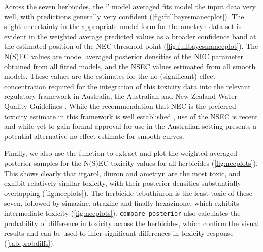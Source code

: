 \documentclass[
  shortnames]{jss}
\newcommand{\cls}[1]{`\code{#1}'}
\begin{document}
Across the seven herbicides, the \cls{bayesmanecfit} model averaged fits model the input data very well, with predictions generally very confident (\autoref{fig:fullbayesmanecplot}). The slight uncertainty in the appropriate model form for the ametryn data set is evident in the weighted average predicted values as a broader confidence band at the estimated position of the NEC threshold point (\autoref{fig:fullbayesmanecplot}). The N(S)EC values are model averaged posterior densities of the NEC parameter obtained from all fitted  models, and the NSEC values estimated from all smooth  models. These values are the  estimates for the no-(significant)-effect concentration required for the integration of this toxicity data into the relevant regulatory framework in Australia, the Australian and New Zealand Water Quality Guidelines \citep{anzg}. While the recommendation that NEC is the preferred toxicity estimate in this framework is well established \citep{Warne2015, Warne2018c}, use of the NSEC is recent \citep{Fisher2023} and while yet to gain formal approval for use in the Australian setting presents a potential alternative no-effect estimate for smooth curves.

Finally, we also use the  function to extract and plot the weighted averaged posterior samples for the N(S)EC toxicity values for all herbicides (\autoref{fig:necplots}). This shows clearly that irgarol, diuron and ametryn are the most toxic, and exhibit relatively similar toxicity, with their posterior densities substantially overlapping (\autoref{fig:necplots}). The herbicide tebuthiuron is the least toxic of these seven, followed by simazine, atrazine and finally hexazinone, which exhibits intermediate toxicity (\autoref{fig:necplots}). \texttt{compare\_posterior} also calculates the probability of difference in toxicity across the herbicides, which confirm the visual results and can be used to infer significant differences in toxicity response (\autoref{tab:probdiffs}).

\begin{CodeChunk}
\end{CodeChunk}
\end{document}
